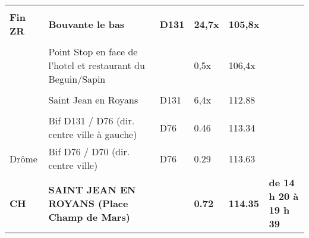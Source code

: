 \documentclass{article}%
\begin{document}
\begin{longtable}{p{2.25cm}|p{7.0cm}|p{1.5cm}|p{1.5cm}|p{1.5cm}|p{3.5cm}}
 & & & & & \\%
\textbf{Fin ZR}&\textbf{Bouvante le bas}&\textbf{D131}&\textbf{24,7x}&\textbf{105,8x}& \\%
 & & & & & \\%
 &Point Stop en face de l'hotel et restaurant du Beguin/Sapin& &0,5x&106,4x& \\%
 & & & & & \\%
 &Saint Jean en Royans&D131&6,4x&112.88& \\%
 & & & & & \\%
 &Bif D131 / D76 (dir. centre ville à gauche)&D76&0.46&113.34& \\%
Drôme&Bif D76 / D70 (dir. centre ville)&D76&0.29&113.63& \\%
\textbf{CH}&\textbf{SAINT JEAN EN ROYANS (Place Champ de Mars)}& &\textbf{0.72}&\textbf{114.35}&\textbf{de 14 h 20 à 19 h 39}\\%
\hline%
\end{longtable}%
\end{document}
